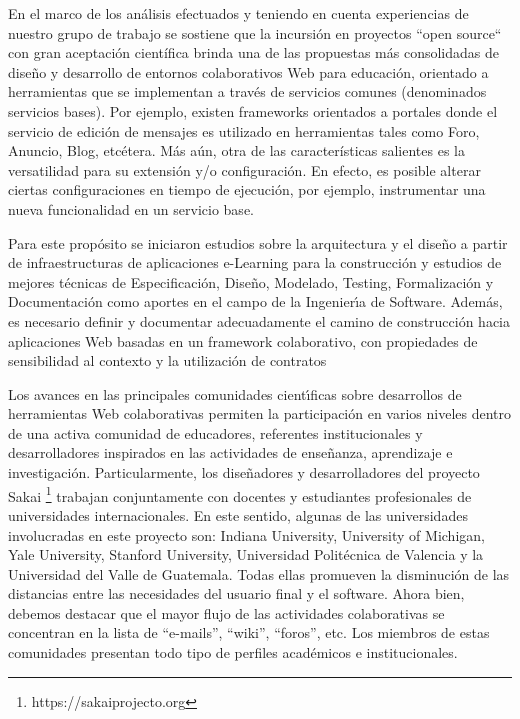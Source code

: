 En el marco de los análisis efectuados y teniendo en cuenta
experiencias de nuestro grupo de trabajo se sostiene que la incursión en
proyectos “open source“ con gran aceptación científica brinda una
de las propuestas más consolidadas de diseño y desarrollo de entornos colaborativos Web para educación, orientado a herramientas que se implementan a través de servicios comunes (denominados servicios bases). Por ejemplo, existen frameworks orientados a portales
donde el servicio de edición de mensajes es utilizado en herramientas tales como Foro, Anuncio, Blog, etcétera. Más aún, otra de las características salientes es la versatilidad para su extensión y/o configuración. En efecto, es posible alterar ciertas configuraciones
en tiempo de ejecución, por ejemplo, instrumentar una nueva funcionalidad en un servicio base.

Para este propósito se iniciaron estudios sobre la arquitectura y el diseño a partir de infraestructuras de aplicaciones e-Learning para la construcción y estudios de mejores técnicas de Especificación, Diseño, Modelado, Testing, Formalización y Documentación como aportes en el campo de la Ingenierı́a de Software. Además, es necesario definir y documentar adecuadamente el camino de construcción hacia  aplicaciones Web basadas en un framework colaborativo, con propiedades de sensibilidad al contexto y la utilización de contratos \cite{arqDHD21}




Los avances en las principales comunidades cientı́ficas sobre desarrollos de herramientas Web colaborativas permiten la participación
en varios niveles dentro de una activa comunidad de educadores, referentes institucionales y desarrolladores inspirados en las actividades de enseñanza, aprendizaje e investigación. Particularmente, los diseñadores y desarrolladores del proyecto Sakai \footnote{https://sakaiprojecto.org} trabajan conjuntamente con docentes y estudiantes profesionales de universidades internacionales. En este sentido, algunas de las universidades involucradas
en este proyecto son: Indiana University, University of Michigan, Yale University, Stanford University, Universidad Politécnica de Valencia y la Universidad del Valle de Guatemala. Todas ellas promueven la disminución de las distancias entre las necesidades del usuario final y el software. Ahora bien, debemos destacar que el mayor flujo de las actividades colaborativas se concentran en la lista de “e-mails”, “wiki”, “foros”, etc. Los miembros de estas comunidades presentan todo tipo de perfiles académicos e institucionales.


